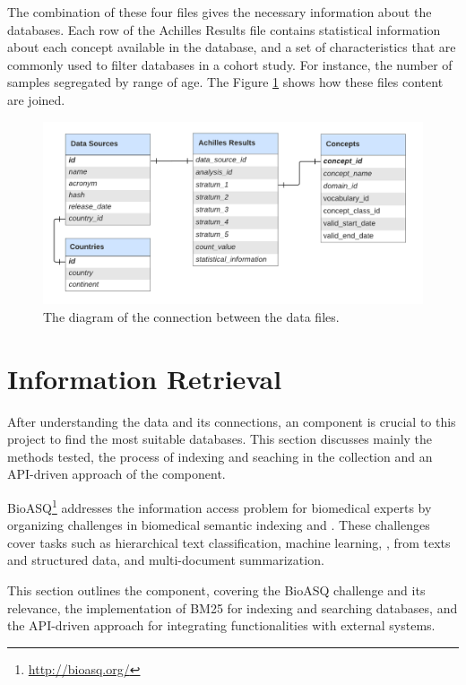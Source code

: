 \hspace{1cm}

The combination of these four files gives the necessary information about the databases. Each row of the Achilles Results file contains statistical information about each concept available in the database, and a set of characteristics that are commonly used to filter databases in a cohort study. For instance, the number of samples segregated by range of age. The Figure \ref{fig_data_diagram} shows how these files content are joined.


\begin{figure}[H]
    \includegraphics[width=1\textwidth]{figs/chapter3/data_diagram.png}
    \centering
    \caption{The diagram of the connection between the data files.}
    \label{fig_data_diagram}
\end{figure}


\section{Information Retrieval}

After understanding the data and its connections, an {\ir} component is crucial to this project to find the most suitable databases. This section discusses mainly the {\ir} methods tested, the process of indexing and seaching in the collection and an API-driven approach of the {\ir} component.


BioASQ\footnote{\url{http://bioasq.org/}} addresses the information access problem for biomedical experts by organizing challenges in biomedical semantic indexing and {\qa}. These challenges cover tasks such as hierarchical text classification, machine learning, {\ir}, {\qa} from texts and structured data, and multi-document summarization.

This section outlines the {\ir} component, covering the BioASQ challenge and its relevance, the implementation of BM25 for indexing and searching databases, and the API-driven approach for integrating {\ir} functionalities with external systems.


